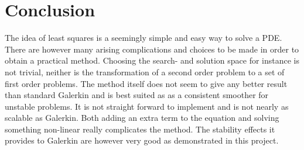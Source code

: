 \section{Conclusion}

The idea of least squares is a seemingly simple and easy way to solve a PDE. There are however many arising complications and choices to be made in order to obtain a practical method. Choosing the search- and solution space for instance is not trivial, neither is the transformation of a second order problem to a set of first order problems. The method itself does not seem to give any better result than standard Galerkin and is best suited as as a consistent smoother for unstable problems. It is not straight forward to implement and is not nearly as scalable as Galerkin. Both adding an extra term to the equation and solving something non-linear really complicates the method. The stability effects it provides to Galerkin are however very good as demonstrated in this project.
